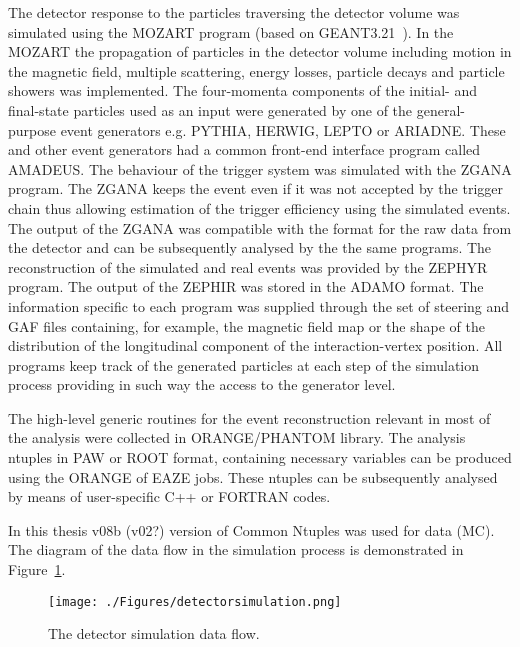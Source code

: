 The detector response to the particles traversing the detector volume was simulated using the MOZART program (based on GEANT3.21~\cite{tech:cern-dd-ee-84-1}). In the MOZART the propagation of particles in the detector volume including motion in the magnetic field, multiple scattering, energy losses, particle decays and particle showers was implemented. The four-momenta components of the initial- and final-state particles used as an input were generated by one of the general-purpose event generators e.g. PYTHIA, HERWIG, LEPTO or ARIADNE. These and other event generators had a common front-end interface program called AMADEUS. The behaviour of the trigger system was simulated with the ZGANA program. The ZGANA keeps the event even if it was not accepted by the trigger chain thus allowing estimation of the trigger efficiency using the simulated events. The output of the ZGANA was compatible with the format for the raw data from the detector and can be subsequently analysed by the the same programs. The reconstruction of the simulated and real events was provided by the ZEPHYR program. The output of the ZEPHIR was stored in the ADAMO format. The information specific to each program was supplied through the set of steering and GAF files containing, for example, the magnetic field map or the shape of the distribution of the longitudinal component of the interaction-vertex position. All programs keep track of the generated particles at each step of the simulation process providing in such way the access to the generator level.

The high-level generic routines for the event reconstruction relevant in most of the analysis were collected in ORANGE/PHANTOM library. The analysis ntuples in PAW or ROOT format, containing necessary variables can be produced using the ORANGE of EAZE jobs. These ntuples can be subsequently analysed by means of user-specific C++ or FORTRAN codes. 

In this thesis v08b (v02?) version of Common Ntuples was used for data (MC). The diagram of the data flow in the simulation process is demonstrated in Figure~\ref{fig:detectorsimulation}.

\begin{figure}[p]
	\centering
		\texttt{[image: ./Figures/detectorsimulation.png]}
	\caption{The \zeus detector simulation data flow.}
	\label{fig:detectorsimulation}
\end{figure}
